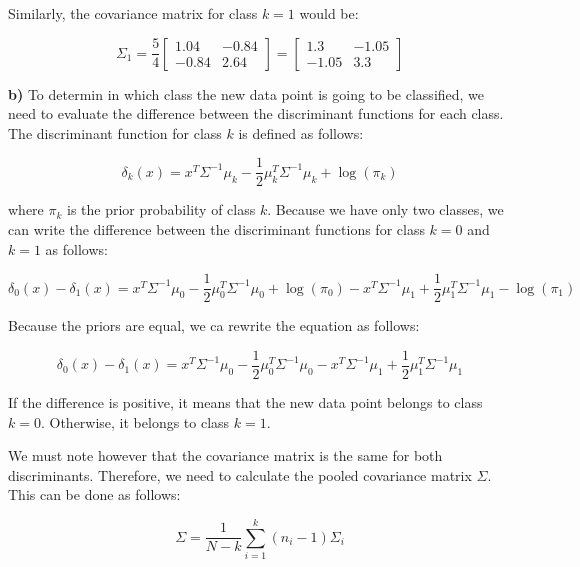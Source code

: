 \documentclass{article}
\begin{document}
Similarly, the covariance matrix for class $k = 1$ would be:

\begin{equation}
  \Sigma_1 = \frac{5}{4}\begin{bmatrix}
    1.04 & -0.84 \\
    -0.84 & 2.64
  \end{bmatrix}
  = \begin{bmatrix}
    1.3 & -1.05 \\
    -1.05 & 3.3
  \end{bmatrix}
\end{equation}

\textbf{b)}
To determin in which class the new data point is going to be classified, we need to evaluate the difference between the discriminant functions for each class. The discriminant function for class $k$ is defined as follows:

\begin{equation}
  \delta_k(x) = x^T \Sigma^{-1}\mu_k - \frac{1}{2}\mu_k^T \Sigma^{-1}\mu_k + \log(\pi_k)
\end{equation}

where $\pi_k$ is the prior probability of class $k$. Because we have only two classes, we can write the difference between the discriminant functions for class $k = 0$ and $k = 1$ as follows:

\begin{equation}
  \delta_0(x) - \delta_1(x) = x^T \Sigma^{-1}\mu_0 - \frac{1}{2}\mu_0^T \Sigma^{-1}\mu_0 + \log(\pi_0) - x^T \Sigma^{-1}\mu_1 + \frac{1}{2}\mu_1^T \Sigma^{-1}\mu_1 - \log(\pi_1)
\end{equation}

Because the priors are equal, we ca rewrite the equation as follows:

\begin{equation}
  \delta_0(x) - \delta_1(x) = x^T \Sigma^{-1}\mu_0 - \frac{1}{2}\mu_0^T \Sigma^{-1}\mu_0 - x^T \Sigma^{-1}\mu_1 + \frac{1}{2}\mu_1^T \Sigma^{-1}\mu_1
\end{equation}

If the difference is positive, it means that the new data point belongs to class $k = 0$. Otherwise, it belongs to class $k = 1$.

We must note however that the covariance matrix is the same for both discriminants. 
Therefore, we need to calculate the pooled covariance matrix $\Sigma$. This can be done as follows:

\begin{equation}
  \Sigma = \frac{1}{N - k} \sum_{i=1}^{k} (n_i - 1) \Sigma_i
\end{equation}
\end{document}
